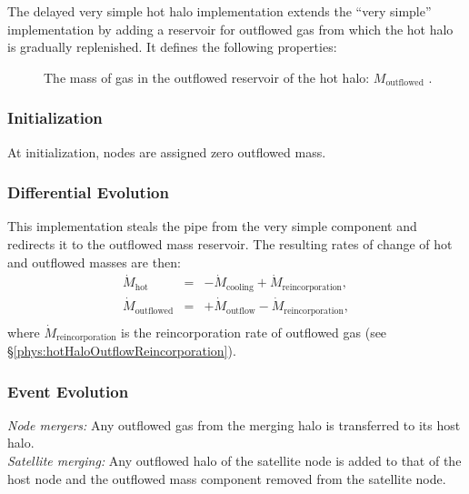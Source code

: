 The delayed very simple hot halo implementation extends the ``very simple'' implementation by adding a reservoir for outflowed gas from which the hot halo is gradually replenished. It defines the following properties:
\begin{description}
 \item [] The mass of gas in the outflowed reservoir of the hot halo: $M_\mathrm{outflowed}$ \mono{[hotHaloOutflowedMass]}.
\end{description}

\subsubsection{Initialization}

At initialization, nodes are assigned zero outflowed mass.

\subsubsection{Differential Evolution}

This implementation steals the  pipe from the very simple component and redirects it to the outflowed mass reservoir. The resulting rates of change of hot and outflowed masses are then:
\begin{eqnarray}
 \dot{M}_\mathrm{hot}      &=& - \dot{M}_\mathrm{cooling} + \dot{M}_\mathrm{reincorporation}, \nonumber \\
 \dot{M}_\mathrm{outflowed} &=& + \dot{M}_\mathrm{outflow} - \dot{M}_\mathrm{reincorporation}, \nonumber \\
\end{eqnarray}
where $\dot{M}_\mathrm{reincorporation}$ is the reincorporation rate of outflowed gas (see \S\ref{phys:hotHaloOutflowReincorporation}).

\subsubsection{Event Evolution}

\noindent\emph{Node mergers:} Any outflowed gas from the merging halo is transferred to its host halo.\\

\noindent\emph{Satellite merging:} Any outflowed halo of the satellite \gls{node} is added to that of the host \gls{node} and the outflowed mass \gls{component} removed from the satellite node.\\

